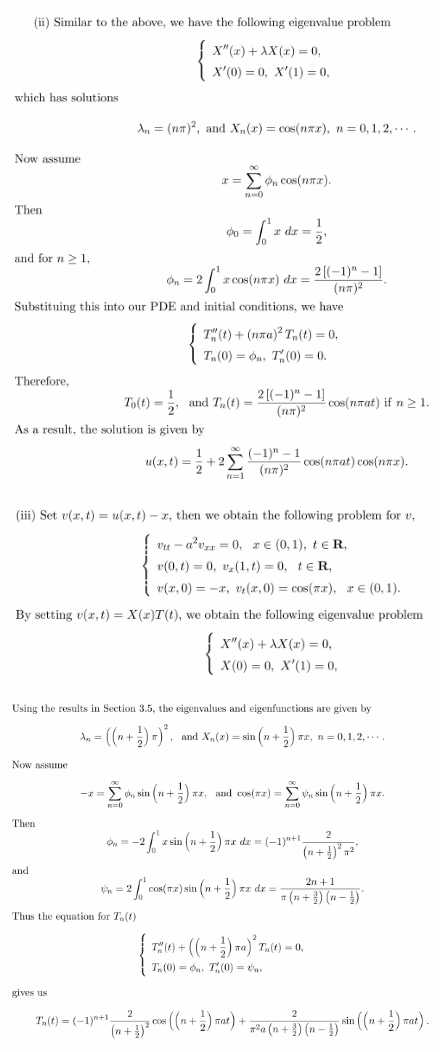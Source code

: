 \begin{figure}[H]
    \includegraphics[width=.8\textwidth]{figures/5.2-2.png}
\end{figure}
\begin{figure}[H]
    \includegraphics[width=.75\textwidth]{figures/5.2-3.png}
\end{figure}
\begin{figure}[H]
    \includegraphics[width=.9\textwidth]{figures/5.2-4.png}
\end{figure}
